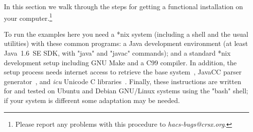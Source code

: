 \documentclass[11pt]{article} %
\begin{document}
In this section we walk through the steps for getting a functional \HAX installation on your
computer.\footnote{Please report any problems with this procedure to \emph{hacs-bugs@crsx.org}.}

\begin{requirements}
  To run the \HAX examples here you need a *nix system (including a shell and the usual utilities)
  with these common programs: a Java development environment (at least Java~1.6~SE SDK, with "java"
  and "javac" commands); and a standard *nix development setup including GNU Make and a C99
  compiler. In addition, the setup process needs internet access to retrieve the \CRSX base
  system~\cite{crsx}, JavaCC parser generator~\cite{JavaCC}, and \emph{icu} Unicode C
  libraries~\cite{ICU}. Finally, these instructions are written for and tested on Ubuntu and Debian
  GNU/Linux systems using the "bash" shell; if your system is different some adaptation may be
  needed.
\end{requirements}
\end{document}
